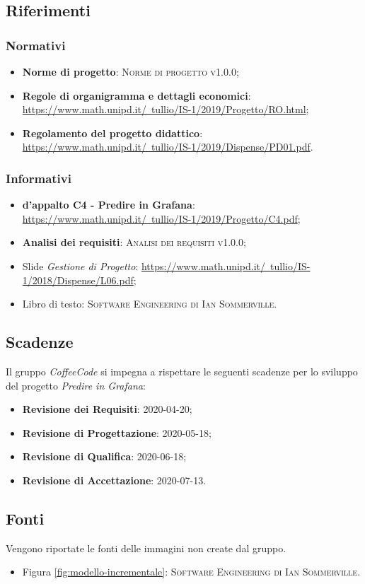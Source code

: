 \documentclass[../piano-di-progetto.tex]{subfiles}
\begin{document}
\subsection{Riferimenti}
\subsubsection{Normativi}
\begin{itemize}
  \item \textbf{Norme di progetto}: \textsc{Norme di progetto v1.0.0};
  \item \textbf{Regole di organigramma e dettagli economici}: \href{https://www.math.unipd.it/~tullio/IS-1/2019/Progetto/RO.html}{https://www.math.unipd.it/~tullio/IS-1/2019/Progetto/RO.html};
  \item \textbf{Regolamento del progetto didattico}: \href{https://www.math.unipd.it/~tullio/IS-1/2019/Dispense/PD01.pdf}{https://www.math.unipd.it/~tullio/IS-1/2019/Dispense/PD01.pdf}.
\end{itemize}

\subsubsection{Informativi}
\begin{itemize}
  \item \textbf{ d’appalto C4 - Predire in Grafana}: \href{https://www.math.unipd.it/~tullio/IS-1/2019/Progetto/C4.pdf}{https://www.math.unipd.it/~tullio/IS-1/2019/Progetto/C4.pdf};
  \item \textbf{Analisi dei requisiti}: \textsc{Analisi dei requisiti v1.0.0};
  \item Slide \emph{Gestione di Progetto}: \href{https://www.math.unipd.it/~tullio/IS-1/2018/Dispense/L06.pdf}{https://www.math.unipd.it/~tullio/IS-1/2018/Dispense/L06.pdf};
  \item Libro di testo: \textsc{Software Engineering di Ian Sommerville}.
\end{itemize}

\subsection{Scadenze}
\label{scadenze}
Il gruppo \emph{CoffeeCode} si impegna a rispettare le seguenti scadenze per lo sviluppo del progetto \emph{Predire in Grafana}:
\begin{itemize}
    \item \textbf{Revisione dei Requisiti}: 2020-04-20;
    \item \textbf{Revisione di Progettazione}: 2020-05-18;
    \item \textbf{Revisione di Qualifica}: 2020-06-18;
    \item \textbf{Revisione di Accettazione}: 2020-07-13.
\end{itemize}

\subsection{Fonti}
Vengono riportate le fonti delle immagini non create dal gruppo.
\begin{itemize}
    \item Figura \ref{fig:modello-incrementale}: \textsc{Software Engineering di Ian Sommerville}.
\end{itemize}
\end{document}
